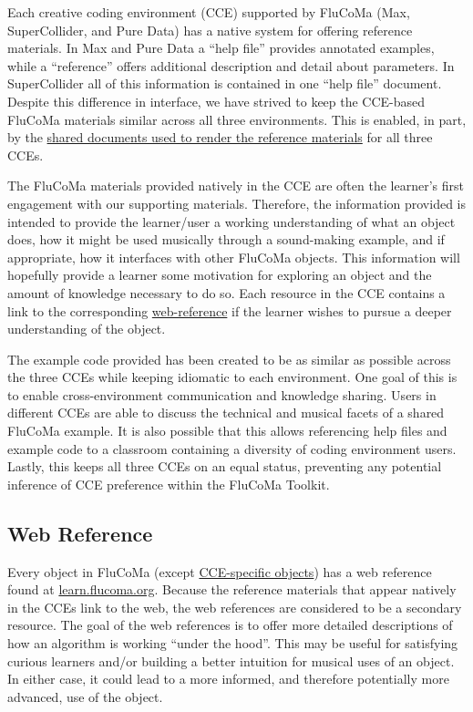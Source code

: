 \documentclass{article}
\begin{document}
Each creative coding environment (CCE) supported by FluCoMa (Max,
SuperCollider, and Pure Data) has a native system for offering reference
materials. In Max and Pure Data a ``help file'' provides annotated
examples, while a ``reference'' offers additional description and detail
about parameters. In SuperCollider all of this information is contained
in one ``help file'' document. Despite this difference in interface, we
have strived to keep the CCE-based FluCoMa materials similar across all
three environments. This is enabled, in part, by the
\href{https://github.com/flucoma/flucoma-docs}{shared documents used to
render the reference materials} for all three CCEs.

The FluCoMa materials provided natively in the CCE are often the
learner's first engagement with our supporting materials. Therefore, the
information provided is intended to provide the learner/user a working
understanding of what an object does, how it might be used musically
through a sound-making example, and if appropriate, how it interfaces
with other FluCoMa objects. This information will hopefully provide a
learner some motivation for exploring an object and the amount of
knowledge necessary to do so. Each resource in the CCE contains a link
to the corresponding \hyperref[web-reference]{web-reference} if the
learner wishes to pursue a deeper understanding of the object.

The example code provided has been created to be as similar as possible
across the three CCEs while keeping idiomatic to each environment. One
goal of this is to enable cross-environment communication and knowledge
sharing. Users in different CCEs are able to discuss the technical and
musical facets of a shared FluCoMa example. It is also possible that
this allows referencing help files and example code to a classroom
containing a diversity of coding environment users. Lastly, this keeps
all three CCEs on an equal status, preventing any potential inference of
CCE preference within the FluCoMa Toolkit.

\subsection{Web Reference}\label{web-reference}

Every object in FluCoMa (except
\hyperref[cce-specific-objects]{CCE-specific objects}) has a web
reference found at \href{https://learn.flucoma.org}{learn.flucoma.org}.
Because the reference materials that appear natively in the CCEs link to the web,
the web references are considered to be a secondary resource. The goal
of the web references is to offer more detailed descriptions of how an
algorithm is working ``under the hood''. This may be useful for
satisfying curious learners and/or building a better intuition for
musical uses of an object. In either case, it could lead to a more
informed, and therefore potentially more advanced, use of the object.
\end{document}
